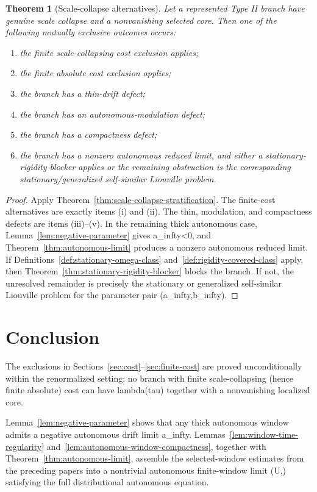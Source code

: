 \documentclass[11pt]{amsart}
\def\({}%
\def\){}%
\def\tau{tau}%
\def\lambda{lambda}%
\def\infty{infty}%
\theoremstyle{plain}
\newtheorem{theorem}{Theorem}[section]
\theoremstyle{definition}
\theoremstyle{remark}
\begin{document}
\begin{theorem}[Scale-collapse alternatives]\label{thm:scale-collapse-alternatives}
Let a represented Type II branch have genuine scale collapse and a nonvanishing selected core.
Then one of the following mutually exclusive outcomes occurs:
\begin{enumerate}[label=(\roman*)]
  \item the finite scale-collapsing cost exclusion applies;
  \item the finite absolute cost exclusion applies;
  \item the branch has a thin-drift defect;
  \item the branch has an autonomous-modulation defect;
  \item the branch has a compactness defect;
  \item the branch has a nonzero autonomous reduced limit, and either a stationary-rigidity
  blocker applies or the remaining obstruction is the corresponding stationary/generalized
  self-similar Liouville problem.
\end{enumerate}
\end{theorem}

\begin{proof}
Apply Theorem~\ref{thm:scale-collapse-stratification}.  The finite-cost alternatives are exactly
items (i) and (ii).  The thin, modulation, and compactness defects are items (iii)--(v).  In the
remaining thick autonomous case, Lemma~\ref{lem:negative-parameter} gives \(a_\infty<0\), and
Theorem~\ref{thm:autonomous-limit} produces a nonzero autonomous reduced limit.  If
Definitions~\ref{def:stationary-omega-class} and~\ref{def:rigidity-covered-class} apply, then
Theorem~\ref{thm:stationary-rigidity-blocker} blocks the branch.  If not, the unresolved
remainder is precisely the stationary or generalized self-similar Liouville problem for the
parameter pair \((a_\infty,b_\infty)\).
\end{proof}

\section{Conclusion}

The exclusions in Sections~\ref{sec:cost}--\ref{sec:finite-cost} are proved unconditionally within
the renormalized setting:
no branch with finite scale-collapsing (hence finite absolute) cost can have
\(\lambda(\tau)\) together with a nonvanishing localized core.

Lemma~\ref{lem:negative-parameter} shows that any thick autonomous window admits a negative
autonomous drift limit \(a_\infty\).  Lemmas~\ref{lem:window-time-regularity}
and~\ref{lem:autonomous-window-compactness}, together with Theorem~\ref{thm:autonomous-limit},
assemble the selected-window estimates from the preceding papers into a nontrivial autonomous
finite-window limit \((U,\Pi)\) satisfying the full distributional autonomous equation.
\end{document}
